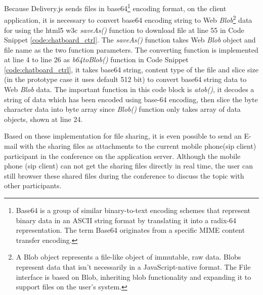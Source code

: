 \par Because Delivery.js sends files in base64\footnote{Base64 is a group of similar binary-to-text encoding schemes that represent binary data in an ASCII string format by translating it into a radix-64 representation. The term Base64 originates from a specific MIME content transfer encoding.\cite{wiki:base64}} encoding format, on the client application, it is necessary to convert base64 encoding string to Web \textit{Blob}\footnote{A Blob object represents a file-like object of immutable, raw data. Blobs represent data that isn't necessarily in a JavaScript-native format. The File interface is based on Blob, inheriting blob functionality and expanding it to support files on the user's system.\cite{mdn:blob}} data for using the \gls{html5} \gls{w3c} \textit{saveAs()} function to download file at line 55 in Code Snippet \ref{code:chatboard_ctrl}. The \textit{saveAs()} function takes Web \textit{Blob} object and file name as the two function parameters. The converting function is implemented at line 4 to line 26 as \textit{b64toBlob()} function in Code Snippet \ref{code:chatboard_ctrl}, it takes base64 string, content type of the file and slice size (in the prototype case it uses default 512 bit) to convert base64 string data to Web \textit{Blob} data. The important function in this code block is \textit{atob()}, it decodes a string of data which has been encoded using base-64 encoding, then slice the byte character data into byte array since \textit{Blob()} function only takes array of data objects, shown at line 24.

\par Based on these implementation for file sharing, it is even possible to send an E-mail with the sharing files as attachments to the current mobile phone(\gls{sip} client) participant in the conference on the application server. Although the mobile phone (\gls{sip} client) can not get the sharing files directly in real time, the user can still browser these shared files during the conference to discuss the topic with other participants.

